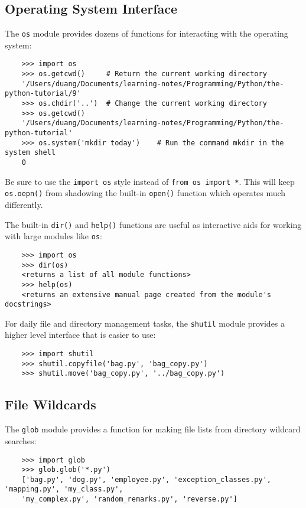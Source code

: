 \documentclass[UTF8]{article}
\begin{document}
\subsection{Operating System Interface}
The \texttt{os} module provides dozens of functions for interacting with the operating system:
\begin{verbatim}
    >>> import os
    >>> os.getcwd()     # Return the current working directory
    '/Users/duang/Documents/learning-notes/Programming/Python/the-python-tutorial/9'
    >>> os.chdir('..')  # Change the current working directory
    >>> os.getcwd()
    '/Users/duang/Documents/learning-notes/Programming/Python/the-python-tutorial'
    >>> os.system('mkdir today')    # Run the command mkdir in the system shell
    0
\end{verbatim}

Be sure to use the \texttt{import os} style instead of
\texttt{from os import *}. This will keep \texttt{os.oepn()} from shadowing the
built-in \texttt{open()} function which operates much differently.

The built-in \texttt{dir()} and \texttt{help()} functions are useful as interactive aids for
working with large modules like \texttt{os}:
\begin{verbatim}
    >>> import os
    >>> dir(os)
    <returns a list of all module functions>
    >>> help(os)
    <returns an extensive manual page created from the module's docstrings>
\end{verbatim}

For daily file and directory management tasks, the \texttt{shutil} module provides a higher level
interface that is easier to use:
\begin{verbatim}
    >>> import shutil
    >>> shutil.copyfile('bag.py', 'bag_copy.py')
    >>> shutil.move('bag_copy.py', '../bag_copy.py')
\end{verbatim}

\subsection{File Wildcards}
The \texttt{glob} module provides a function for making file lists from directory wildcard searches:
\begin{verbatim}
    >>> import glob
    >>> glob.glob('*.py')
    ['bag.py', 'dog.py', 'employee.py', 'exception_classes.py', 'mapping.py', 'my_class.py',
    'my_complex.py', 'random_remarks.py', 'reverse.py']
\end{verbatim}
\end{document}
